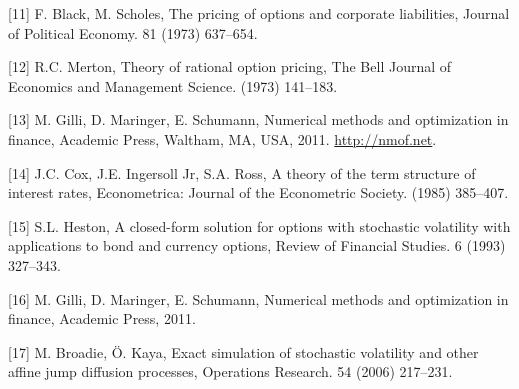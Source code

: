 \documentclass[12pt,twoside]{reedthesis}
\theoremstyle{definition}
\theoremstyle{definition}
\theoremstyle{remark}
\begin{document}
  \hypertarget{ref-black1973pricing}{}
  {[}11{]} F. Black, M. Scholes, The pricing of options and corporate
  liabilities, Journal of Political Economy. 81 (1973) 637--654.
  
  \hypertarget{ref-merton1973theory}{}
  {[}12{]} R.C. Merton, Theory of rational option pricing, The Bell
  Journal of Economics and Management Science. (1973) 141--183.
  
  \hypertarget{ref-nmof}{}
  {[}13{]} M. Gilli, D. Maringer, E. Schumann, Numerical methods and
  optimization in finance, Academic Press, Waltham, MA, USA, 2011.
  \url{http://nmof.net}.
  
  \hypertarget{ref-cox1985theory}{}
  {[}14{]} J.C. Cox, J.E. Ingersoll Jr, S.A. Ross, A theory of the term
  structure of interest rates, Econometrica: Journal of the Econometric
  Society. (1985) 385--407.
  
  \hypertarget{ref-heston1993closed}{}
  {[}15{]} S.L. Heston, A closed-form solution for options with stochastic
  volatility with applications to bond and currency options, Review of
  Financial Studies. 6 (1993) 327--343.
  
  \hypertarget{ref-gilli_numerical_2011}{}
  {[}16{]} M. Gilli, D. Maringer, E. Schumann, Numerical methods and
  optimization in finance, Academic Press, 2011.
  
  \hypertarget{ref-broadie2006exact}{}
  {[}17{]} M. Broadie, Ö. Kaya, Exact simulation of stochastic volatility
  and other affine jump diffusion processes, Operations Research. 54
  (2006) 217--231.


\end{document}
